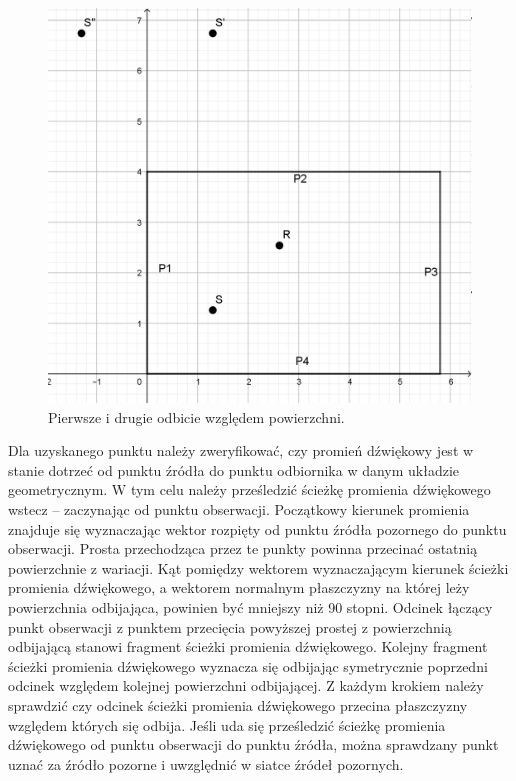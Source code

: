 \begin{figure}[h]
        \centering
                \centering
                \includegraphics[width=12cm]{rys2}
	\caption{Pierwsze i drugie odbicie względem powierzchni.}
\end{figure}

Dla uzyskanego punktu należy zweryfikować, czy promień dźwiękowy jest w stanie dotrzeć od punktu źródła do punktu odbiornika w danym układzie geometrycznym. W tym celu należy prześledzić ścieżkę promienia dźwiękowego wstecz – zaczynając od punktu obserwacji. Początkowy kierunek promienia znajduje się wyznaczając wektor rozpięty od punktu źródła pozornego do punktu obserwacji. Prosta przechodząca przez te punkty powinna przecinać ostatnią powierzchnie z wariacji. Kąt pomiędzy wektorem wyznaczającym kierunek ścieżki promienia dźwiękowego, a wektorem normalnym płaszczyzny na której leży powierzchnia odbijająca, powinien być mniejszy niż 90 stopni. Odcinek łączący punkt obserwacji z punktem przecięcia powyższej prostej z powierzchnią odbijającą stanowi fragment ścieżki promienia dźwiękowego. Kolejny  fragment ścieżki promienia dźwiękowego wyznacza się odbijając symetrycznie poprzedni odcinek względem kolejnej powierzchni odbijającej. Z każdym krokiem należy sprawdzić czy odcinek ścieżki promienia dźwiękowego przecina płaszczyzny względem których się odbija. Jeśli uda się prześledzić ścieżkę promienia dźwiękowego od punktu obserwacji do punktu źródła, można sprawdzany punkt uznać za źródło pozorne i uwzględnić w siatce źródeł pozornych.

